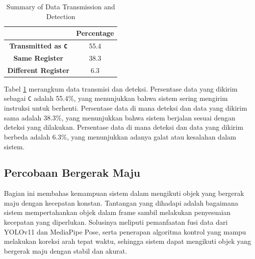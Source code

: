 \begin{table}[H]
    \centering
    \caption{Summary of Data Transmission and Detection}
    \label{tab:summary_data_transmission_detection}
    \begin{tabular}{|c|c|}
        \hline 
        \cellcolor[HTML]{000000} & \cellcolor[HTML]{C0C0C0} \textbf{Percentage}   \\ \hline
        \cellcolor[HTML]{C0C0C0} \textbf{Transmitted as \texttt{C}} & 55.4  \\ \hline
        \cellcolor[HTML]{C0C0C0} \textbf{Same Register}  & 38.3 \\ \hline
        \cellcolor[HTML]{C0C0C0} \textbf{Different Register}  & 6.3 \\ \hline
    \end{tabular}
\end{table}

Tabel \ref{tab:summary_data_transmission_detection} merangkum data transmisi dan deteksi. Persentase data yang dikirim sebagai \texttt{C} adalah 55.4\%, yang menunjukkan bahwa sistem sering mengirim instruksi untuk berhenti. Persentase data di mana deteksi dan data yang dikirim sama adalah 38.3\%, yang menunjukkan bahwa sistem berjalan sesuai dengan deteksi yang dilakukan. Persentase data di mana deteksi dan data yang dikirim berbeda adalah 6.3\%, yang menunjukkan adanya galat atau kesalahan dalam sistem.

\newpage
\subsection{Percobaan Bergerak Maju}
\label{subsec:percobaanbergerakmaju}

Bagian ini membahas kemampuan sistem dalam mengikuti objek yang bergerak maju dengan kecepatan konstan. Tantangan yang dihadapi adalah bagaimana sistem mempertahankan objek dalam frame sambil melakukan penyesuaian kecepatan yang diperlukan. Solusinya meliputi pemanfaatan fusi data dari YOLOv11 dan MediaPipe Pose, serta penerapan algoritma kontrol yang mampu melakukan koreksi arah tepat waktu, sehingga sistem dapat mengikuti objek yang bergerak maju dengan stabil dan akurat.

